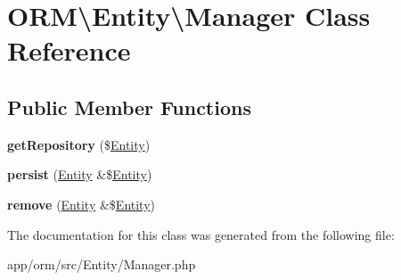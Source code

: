 \hypertarget{classORM_1_1Entity_1_1Manager}{}\section{O\+RM\textbackslash{}Entity\textbackslash{}Manager Class Reference}
\label{classORM_1_1Entity_1_1Manager}
\subsection*{Public Member Functions}
\begin{DoxyCompactItemize}
\item 
{\bfseries get\+Repository} (\$\hyperlink{classORM_1_1Entity_1_1Entity}{Entity})\hypertarget{classORM_1_1Entity_1_1Manager_a4cbbaa3a1d3ee9618250ce0c293bba0d}{}\label{classORM_1_1Entity_1_1Manager_a4cbbaa3a1d3ee9618250ce0c293bba0d}

\item 
{\bfseries persist} (\hyperlink{classORM_1_1Entity_1_1Entity}{Entity} \&\$\hyperlink{classORM_1_1Entity_1_1Entity}{Entity})\hypertarget{classORM_1_1Entity_1_1Manager_a03fa49bbe3d431c71432a21634707d19}{}\label{classORM_1_1Entity_1_1Manager_a03fa49bbe3d431c71432a21634707d19}

\item 
{\bfseries remove} (\hyperlink{classORM_1_1Entity_1_1Entity}{Entity} \&\$\hyperlink{classORM_1_1Entity_1_1Entity}{Entity})\hypertarget{classORM_1_1Entity_1_1Manager_a982ca1c24366de2fe472258f4d0d9ae7}{}\label{classORM_1_1Entity_1_1Manager_a982ca1c24366de2fe472258f4d0d9ae7}

\end{DoxyCompactItemize}


The documentation for this class was generated from the following file\+:\begin{DoxyCompactItemize}
\item 
app/orm/src/\+Entity/Manager.\+php\end{DoxyCompactItemize}
